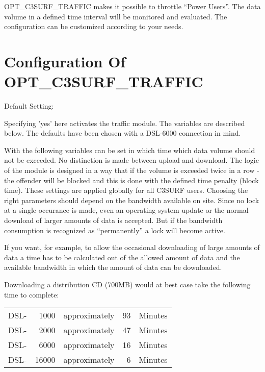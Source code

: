   OPT\_C3SURF\_TRAFFIC makes it possible to throttle ``Power Users''.
  The data volume in a defined time interval will be monitored and evaluated. The
  configuration can be customized according to your needs.

\section {Configuration Of OPT\_C3SURF\_TRAFFIC}

\begin{description}


  Default Setting: 

  Specifying 'yes' here activates the traffic module. The variables are described
  below. The defaults have been chosen with a DSL-6000 connection in mind.

  With the following variables can be set in which time which data volume should not be exceeded.
  No distinction is made between upload and download. The logic of the module is designed in a way
  that if the volume is exceeded twice in a row - the offender will be blocked and this is done with
  the defined time penalty (block time). These settings are applied globally for all C3SURF users.
  Choosing the right parameters should depend on the bandwidth available on site. Since no lock at
  a single occurance is made, even an operating system update or the normal download of larger amounts
  of data is accepted. But if the bandwidth consumption is recognized as ``permanently'' a lock will
  become active.

  If you want, for example, to allow the occasional downloading of large amounts of data a time has to be
  calculated out of the allowed amount of data and the available bandwidth in which the amount of data
  can be downloaded.


   Downloading a distribution CD (700MB) would at best
   case take the following time to complete:

   \begin{tabular}{lrlrl}

    DSL-&1000 & approximately & 93 & Minutes \\
    DSL-&2000 & approximately & 47 & Minutes \\
    DSL-&6000 & approximately & 16 & Minutes \\
    DSL-&16000 & approximately & 6 & Minutes \\


\end{tabular}
\end{description}
